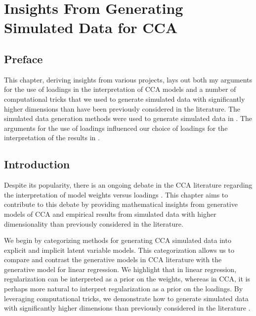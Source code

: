 \graphicspath{{chapters/loadings/}}


\chapter{Insights From Generating Simulated Data for CCA}\label{ch:loadings}
\minitoc
\section*{Preface}

This chapter, deriving insights from various projects, lays out both my arguments for the use of loadings in the interpretation of CCA models and a number of computational tricks that we used to generate simulated data with significantly higher dimensions than have been previously considered in the literature.
The simulated data generation methods were used to generate simulated data in \citet{mihalik2022canonical}.
The arguments for the use of loadings influenced our choice of loadings for the interpretation of the results in \citet{ADAMS2024}.

\section{Introduction}

Despite its popularity, there is an ongoing debate in the CCA literature regarding the interpretation of model weights versus loadings \citep{gu2018simultaneous}. This chapter aims to contribute to this debate by providing mathematical insights from generative models of CCA and empirical results from simulated data with higher dimensionality than previously considered in the literature.

We begin by categorizing methods for generating CCA simulated data into explicit and implicit latent variable models. This categorization allows us to compare and contrast the generative models in CCA literature with the generative model for linear regression. We highlight that in linear regression, regularization can be interpreted as a prior on the weights, whereas in CCA, it is perhaps more natural to interpret regularization as a prior on the loadings. By leveraging computational tricks, we demonstrate how to generate simulated data with significantly higher dimensions than previously considered in the literature \citep{helmer2020stability, matkovivc2023static}.

